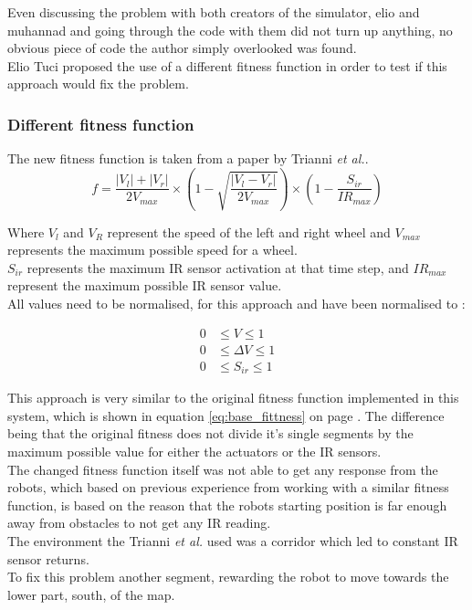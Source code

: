 Even discussing the problem with both creators of the simulator, elio and muhannad and going through the code with them did not turn up anything, no obvious piece of code the author simply overlooked was found.\\
Elio Tuci proposed the use of a different fitness function in order to test if this approach would fix the problem.\\

\subsubsection{Different fitness function}
The new fitness function is taken from a paper by Trianni \textit{et al.}\cite{Trianni}.\\

\begin{equation}
f = \frac{|V_l| + |V_r|}{2V_{max}} \times ( 1 - \sqrt{\frac{|V_l - V_r|}{2V_{max}}}) \times (1 - \frac{S_{ir}}{IR_{max}})
\end{equation}

Where $V_l$ and $V_R$ represent the speed of the left and right wheel and $V_{max}$ represents the maximum possible speed for a wheel.\\
$S_{ir}$ represents the maximum IR sensor activation at that time step, and $IR_{max}$ represent the maximum possible IR sensor value. \\
All values need to be normalised, for this approach and have been normalised to :

\begin{align*}
	0  &\leq V \leq 1 \\  
	0  &\leq \Delta V  \leq 1 \\
	0  &\leq S_{ir} \leq 1
\end{align*}

This approach is very similar to the original fitness function implemented in this system, which is shown in equation \ref{eq:base_fittness} on page \pageref{eq:base_fittness}. The difference being that the original fitness does not divide it's single segments by the maximum possible value for either the actuators or the IR sensors.\\
The changed fitness function itself was not able to get any response from the robots, which based on previous experience from working with a similar fitness function, is based on the reason that the robots starting position is far enough away from obstacles to not get any IR reading.\\
The environment the Trianni \textit{et al.} used was a corridor which led to constant IR sensor returns.\\
To fix this problem another segment, rewarding the robot to move towards the lower part, south, of the map. \\

